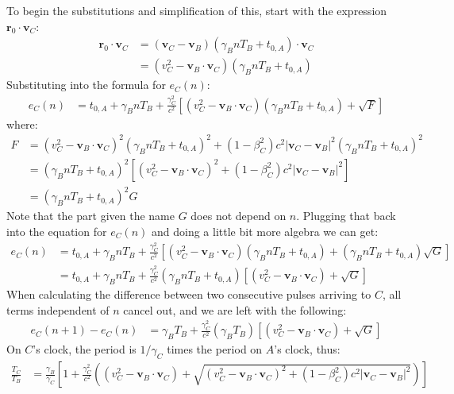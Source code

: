\documentclass[a4paper]{article}
\theoremstyle{plain}
\theoremstyle{definition}
\newcommand{\vect}[1]{\mathbf{#1}}
\begin{document}
To begin the substitutions and simplification of this, start with the
expression $\vect{r}_0 \cdot \vect{v}_C$:
\begin{align*}
\vect{r}_0 \cdot \vect{v}_C
  & = (\vect{v}_C - \vect{v}_B) (\gamma_B n T_B + t_{0,A}) \cdot \vect{v}_C \\
  & = (v_C^2 - \vect{v}_B \cdot \vect{v}_C) (\gamma_B nT_B + t_{0,A})
\end{align*}
Substituting into the formula for $e_C(n)$:
\begin{align*}
e_{C}(n) & = t_{0,A} + \gamma_B nT_B + \frac{\gamma_C^2}{c^2} \left[ (v_C^2 - \vect{v}_B \cdot \vect{v}_C) (\gamma_B nT_B + t_{0,A}) + \sqrt{F} \right]
\end{align*}
where:
\begin{align*}
F & = (v_C^2 - \vect{v}_B \cdot \vect{v}_C)^2 (\gamma_B nT_B + t_{0,A})^2 + (1-\beta_C^2)c^2 |\vect{v}_C - \vect{v}_B|^2 (\gamma_B nT_B + t_{0,A})^2 \\
  & = (\gamma_B nT_B + t_{0,A})^2 \left[ (v_C^2 - \vect{v}_B \cdot \vect{v}_C)^2  + (1-\beta_C^2)c^2 |\vect{v}_C - \vect{v}_B|^2 \right] \\
  & = (\gamma_B nT_B + t_{0,A})^2 G
\end{align*}
Note that the part given the name $G$ does not depend on $n$.
Plugging that back into the equation for $e_C(n)$ and doing a little
bit more algebra we can get:
\begin{align*}
e_{C}(n)
  & = t_{0,A} + \gamma_B nT_B + \frac{\gamma_C^2}{c^2} \left[ (v_C^2 - \vect{v}_B \cdot \vect{v}_C) (\gamma_B nT_B + t_{0,A}) + (\gamma_B nT_B + t_{0,A}) \sqrt{G} \right] \\
  & = t_{0,A} + \gamma_B nT_B + \frac{\gamma_C^2}{c^2} (\gamma_B nT_B + t_{0,A}) \left[ (v_C^2 - \vect{v}_B \cdot \vect{v}_C) + \sqrt{G} \right]
\end{align*}
When calculating the difference between two consecutive pulses
arriving to $C$, all terms independent of $n$ cancel out, and we are
left with the following:
\begin{align*}
e_{C}(n+1) - e_{C}(n)
  & = \gamma_B T_B + \frac{\gamma_C^2}{c^2} (\gamma_B T_B) \left[ (v_C^2 - \vect{v}_B \cdot \vect{v}_C) + \sqrt{G} \right]
\end{align*}
On $C$'s clock, the period is $1/\gamma_C$ times the period on $A$'s
clock, thus:
\begin{align}
\frac{T_C}{T_B}
  & = \frac{\gamma_B}{\gamma_C} \left[ 1 + \frac{\gamma_C^2}{c^2} \left( (v_C^2 - \vect{v}_B \cdot \vect{v}_C) + \sqrt{(v_C^2 - \vect{v}_B \cdot \vect{v}_C)^2  + (1-\beta_C^2)c^2 |\vect{v}_C - \vect{v}_B|^2} \right) \right] \label{eqn:scen1c-TC}
\end{align}
\end{document}
